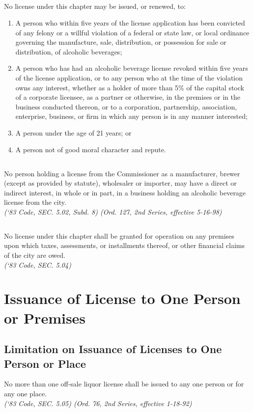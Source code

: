\subsection{}
No license under this chapter may be issued, or renewed, to:
\begin{enumerate}[{\indent}1)]
    \item A person who within five years of the license application has been convicted of any felony or a willful violation of a federal or state law, or local ordinance governing the manufacture, sale, distribution, or possession for sale or distribution, of alcoholic beverages; 
    \item A person who has had an alcoholic beverage license revoked within five years of the license application, or to any person who at the time of the violation owns any interest, whether as a holder of more than 5\% of the capital stock of a corporate licensee, as a partner or otherwise, in the premises or in the business conducted thereon, or to a corporation, partnership, association, enterprise, business, or firm in which any person is in any manner interested; 
    \item A person under the age of 21 years; or
    \item A person not of good moral character and repute.
\end{enumerate}
\subsection{}
No person holding a license from the Commissioner as a manufacturer, brewer (except as provided by statute), wholesaler or importer, may have a direct or indirect interest, in whole or in part, in a business holding an alcoholic beverage license from the city.\\
\emph{(‘83 Code, SEC. 5.02, Subd. 8)  (Ord. 127, 2nd Series, effective 5-16-98)}
\subsection{}
No license under this chapter shall be granted for operation on any premises upon which taxes, assessments, or installments thereof, or other financial claims of the city are owed.\\
\emph{(‘83 Code, SEC. 5.04)}
\section{Issuance of License to One Person or Premises}
\subsection{Limitation on Issuance of Licenses to One Person or Place}
No more than one off-sale liquor license shall be issued to any one person or for any one place.\\
\emph{(‘83 Code, SEC. 5.05)  (Ord. 76, 2nd Series, effective 1-18-92)}
